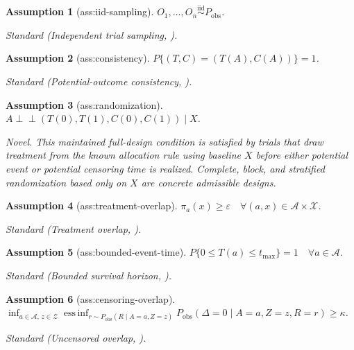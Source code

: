 \documentclass{article}
\newtheorem{assumption}{Assumption}
\begin{document}
\begin{assumption}[ass:iid-sampling]\label{ass:iid-sampling}
\(O_1,\ldots,O_n\overset{\mathrm{iid}}{\sim}P_{\mathrm{obs}}\).
\par\smallskip\noindent\emph{Standard} (Independent trial sampling, \cite{WangFrauenSchweisthalSchroderFeuerriegel2025}).
\end{assumption}

\begin{assumption}[ass:consistency]\label{ass:consistency}
\(P\{(T,C)=(T(A),C(A))\}=1\).
\par\smallskip\noindent\emph{Standard} (Potential-outcome consistency, \cite{WangFrauenSchweisthalSchroderFeuerriegel2025}).
\end{assumption}

\begin{assumption}[ass:randomization]\label{ass:randomization}
\(A\perp\!\!\!\perp (T(0),T(1),C(0),C(1))\mid X\).
\par\smallskip\noindent\emph{Novel.} This maintained full-design condition is satisfied by trials that draw treatment from the known allocation rule using baseline \(X\) before either potential event or potential censoring time is realized. Complete, block, and stratified randomization based only on \(X\) are concrete admissible designs.
\end{assumption}

\begin{assumption}[ass:treatment-overlap]\label{ass:treatment-overlap}
\(\pi_a(x)\ge\varepsilon\quad\forall(a,x)\in\mathcal A\times\mathcal X\).
\par\smallskip\noindent\emph{Standard} (Treatment overlap, \cite{WangFrauenSchweisthalSchroderFeuerriegel2025}).
\end{assumption}

\begin{assumption}[ass:bounded-event-time]\label{ass:bounded-event-time}
\(P\{0\le T(a)\le t_{\max}\}=1\quad\forall a\in\mathcal A\).
\par\smallskip\noindent\emph{Standard} (Bounded survival horizon, \cite{WangFrauenSchweisthalSchroderFeuerriegel2025}).
\end{assumption}

\begin{assumption}[ass:censoring-overlap]\label{ass:censoring-overlap}
\(\inf_{a\in\mathcal A,\,z\in\mathcal Z}\operatorname*{ess\,inf}_{r\sim P_{\mathrm{obs}}(R\mid A=a,Z=z)}P_{\mathrm{obs}}(\Delta=0\mid A=a,Z=z,R=r)\ge\kappa\).
\par\smallskip\noindent\emph{Standard} (Uncensored overlap, \cite{WangFrauenSchweisthalSchroderFeuerriegel2025}).
\end{assumption}
\end{document}
